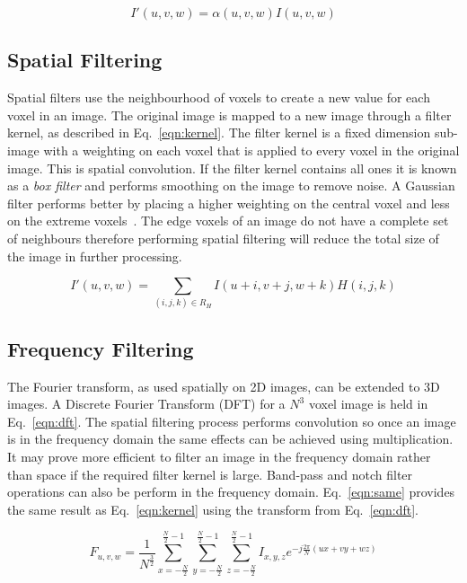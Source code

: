 \documentclass[journal]{IEEEtran}
\begin{document}
\begin{equation}
	I'(u,v,w) = \alpha(u,v,w)I(u,v,w)
	\label{eqn:point} 
\end{equation}



\subsection{Spatial Filtering}
Spatial filters use the neighbourhood of voxels to create a new value for each voxel in an image. 
The original image is mapped to a new image through a filter kernel, as described in Eq.~\eqref{eqn:kernel}.
The filter kernel is a fixed dimension sub-image with a weighting on each voxel that is applied to every voxel in the original image.
This is spatial convolution.
If the filter kernel contains all ones it is known as a \emph{box filter} and performs smoothing on the image to remove noise.
A Gaussian filter performs better by placing a higher weighting on the central voxel and less on the extreme voxels~\cite{lohmann1998volumetric}.
The edge voxels of an image do not have a complete set of neighbours therefore performing spatial filtering will reduce the total size of the image in further processing.

\begin{equation}
	I'(u,v,w) = \sum\limits_{(i,j,k) \in R_H} I(u + i,v + j, w + k)H(i,j,k)
	\label{eqn:kernel} 
\end{equation}



\subsection{Frequency Filtering}
The Fourier transform, as used spatially on 2D images, can be extended to 3D images.
A Discrete Fourier Transform (DFT) for a $N^3$ voxel image is held in Eq.~\eqref{eqn:dft}.
The spatial filtering process performs convolution so once an image is in the frequency domain the same effects can be achieved using multiplication.
It may prove more efficient to filter an image in the frequency domain rather than space if the required filter kernel is large.
Band-pass and notch filter operations can also be perform in the frequency domain.
Eq.~\eqref{eqn:same} provides the same result as Eq.~\eqref{eqn:kernel} using the transform from Eq.~\eqref{eqn:dft}.

\begin{equation}
	F_{u,v,w} = \frac{1}{N^{\frac{3}{2}}} \sum\limits_{x=-\frac{N}{2}}^{\frac{N}{2}-1}\sum\limits_{y=-\frac{N}{2}}^{\frac{N}{2}-1}\sum\limits_{z=-\frac{N}{2}}^{\frac{N}{2}-1}I_{x,y,z}e^{-j\frac{2\pi}{N}(ux + vy + wz)}
	\label{eqn:dft} 
\end{equation}
\end{document}
